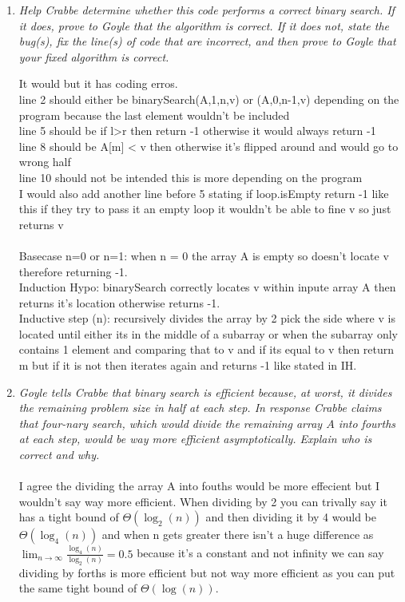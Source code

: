 \documentclass[12pt]{article}
\begin{document}
\begin{enumerate}
	\begin{enumerate}
	\item\textit{ Help Crabbe determine whether this code performs a correct binary search. If it does, prove to Goyle that the algorithm is correct. If it does not, state the bug(s), fix the line(s) of code that are incorrect, and then prove to Goyle that your fixed algorithm is correct.}

It would but it has coding erros.\\
line 2 should either be binarySearch(A,1,n,v) or (A,0,n-1,v) depending on the program because the last element wouldn't be included\\
line 5 should be if l>r then return -1 otherwise it would always return -1\\
line 8 should be A[m] < v then otherwise it's flipped around and would go to wrong half\\
line 10 should not be intended this is more depending on the program\\
I would also add another line before 5 stating if loop.isEmpty return -1 like this if they try to pass it an empty loop it wouldn't be able to fine v so just returns v\\
\\

Basecase n=0 or n=1: when n = 0 the array A is empty so doesn't locate v therefore returning -1. \\ 

Induction Hypo: binarySearch correctly locates v within inpute array A then returns it's location otherwise returns -1.\\ 

Inductive step (n):  recursively  divides the array by 2 pick the side where v is located until either its in the middle of a subarray or when the subarray only contains 1 element and comparing that to v and if its equal to v then return m but if it is not then iterates again and returns -1 like stated in IH. 


	\item\textit{ Goyle tells Crabbe that binary search is efficient because, at worst, it divides the remaining problem size in half at each step. In response Crabbe claims that four-nary search, which would divide the remaining array $A$ into fourths at each step, would be \textit{way more} efficient asymptotically. Explain who is correct and why.}
\\ \\
I agree the dividing the array A into fouths would be more effecient but I wouldn't say way more efficient. When dividing by 2 you can trivally say it has a tight bound of $\Theta(\log_2{(n)})$ and then dividing it by 4 would be $\Theta(\log_4{(n)})$ and when n gets greater there isn't a huge difference as $\displaystyle{\lim_{n \to \infty}} \frac{\log_4{(n)}}{\log_2{(n)}} = 0.5$ because it's a constant and not infinity we can say dividing by forths is more efficient but not way more efficient as you can put the same tight bound of $\Theta(\log(n))$. 



\end{enumerate}
\end{enumerate}
\end{document}
